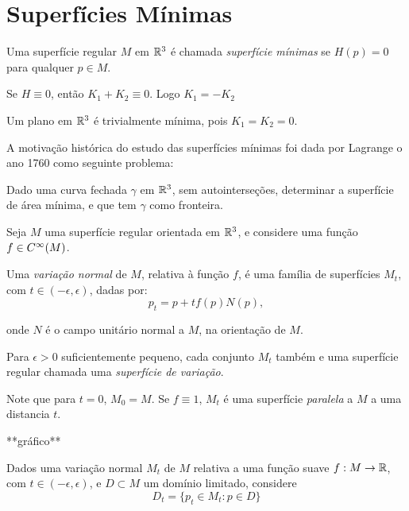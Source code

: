 \section{Superfícies Mínimas}

\begin{definicao}
	Uma superfície regular $M$ em $\mathbb{R}^3$ é chamada \emph{superfície mínimas} se $H(p)=0$ para qualquer $p \in M$.
\end{definicao}

\begin{observacao}
	Se $H \equiv 0$, então $K_1 + K_2 \equiv 0$. Logo $K_1 = -K_2$
\end{observacao}

\begin{exemplo}
	Um plano em $\mathbb{R}^3$ é trivialmente mínima, pois $K_1=K_2=0$.
\end{exemplo}

A motivação histórica do estudo das superfícies mínimas foi dada por Lagrange o ano 1760 como seguinte problema:

Dado uma curva fechada $\gamma$ em $\mathbb{R}^3$, sem autointerseções, determinar a superfície de área mínima, e que tem $\gamma$ como fronteira.

Seja $M$ uma superfície regular orientada em $\mathbb{R}^3$, e considere uma função $f \in C^{\infty}(M)$.

\begin{definicao}
	Uma \emph{variação normal} de $M$, relativa à função $f$, é uma família de superfícies $M_t$, com $t \in (-\epsilon,\epsilon)$, dadas por:
	\begin{equation*}
		p_t = p + t f(p) N(p),
	\end{equation*}
	
	onde $N$ é o campo unitário normal a $M$, na orientação de $M$.
	
\end{definicao}

Para $\epsilon > 0$ suficientemente pequeno, cada conjunto $M_t$ também e uma superfície regular chamada uma \emph{superfície de variação}.

Note que para $t=0$, $M_0=M$. Se $f \equiv 1$, $M_t$ é uma superfície \emph{paralela} a $M$ a uma distancia $t$.

**gráfico**

Dados uma variação normal $M_t$ de $M$ relativa a uma função suave $f: M \rightarrow \mathbb{R}$, com $t \in (-\epsilon,\epsilon)$, e $D \subset M$ um domínio limitado, considere
\begin{equation*}
	D_t = \{ p_t \in M_t: p \in D \}
\end{equation*}


